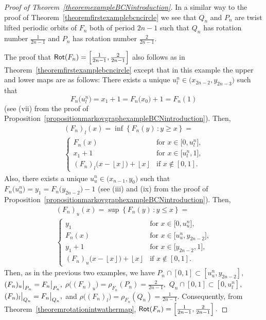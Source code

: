 \documentclass[a4paper, 11pt]{amsart}
\numberwithin{equation}{section}
\theoremstyle{customnumberedtheorem}
\theoremstyle{definitionwithbfnote}
\DeclareMathOperator{\Rot}{\textsf{\upshape Rot}}
\newcommand{\set}[2]{\ensuremath{\left\{#1 \,\colon #2\right\}}}
\newcommand{\floor}[1]{\ensuremath{\left\lfloor #1 \right\rfloor}}
\newcommand{\evalat}[1]{\bigr\rvert\sb{#1}}
\begin{document}
\begin{proof}[Proof of Theorem~\ref{theoremexampleBCNintroduction}]
In a similar way to the proof of Theorem~\ref{theoremfirstexamplebcncircle}
we see that $Q_n$ and $P_n$ are twist lifted periodic orbits of $F_n$
both of period $2n-1$ such that
$Q_n$ has rotation number $\tfrac{1}{2n-1}$ and
$P_n$ has rotation number $\tfrac{2}{2n-1}.$

The proof that $\Rot(F_n) = \left[\tfrac{1}{2n-1}, \tfrac{2}{2n-1}\right]$
also follows as in Theorem~\ref{theoremfirstexamplebcncircle}
except that in this example the upper and lower maps are as follows:
There exists a unique
$u^n_l \in \bigl(x_{2n-2},y_{2n-3}\bigr)$ such that
\[ F_n\bigl(u^n_l\bigr) = x_1 + 1 = F_n\bigl(x_0\bigr) + 1 = F_n(1) \]
(see (vii) from the proof of Proposition~\ref{propositionmarkovgraphexampleBCNintroduction}).
Then,
\begin{multline*}
 (F_n)_l(x) = \inf\set{F_n(y)}{y \ge x} = \\
 \begin{cases}
    F_n(x)& \text{for $x \in \bigl[0, u^n_l\bigr]$,}\\
    x_1+1 & \text{for $x \in \bigl[u^n_l,1\bigr]$,}\\
    (F_n)_l\bigl(x - \floor{x}\bigr) + \floor{x} & \text{if $x \notin [0,1].$}
 \end{cases}
\end{multline*}
Also, there exists a unique $u^n_u \in \bigl(x_{n-1},y_0)$ such that
$F_n\bigl(u^n_u\bigr) = y_{1} = F_n\bigl(y_{2n-2}) - 1$
(see (iii) and (ix) from the proof of Proposition~\ref{propositionmarkovgraphexampleBCNintroduction}).
Then,
\begin{multline*}
 (F_n)_u(x) = \sup\set{F_n(y)}{y \le x} = \\
 \begin{cases}
    y_1   & \text{for $x \in \bigl[0, u^n_u\bigr]$,}\\
    F_n(x)   & \text{for $x \in \bigl[u^n_u,y_{2n-2}\bigr]$,}\\
    y_1+1 & \text{for $x \in \bigl[y_{2n-2}, 1\bigr]$,}\\
    (F_n)_u\bigl(x - \floor{x}\bigr) + \floor{x} & \text{if $x \notin [0,1].$}
 \end{cases}
\end{multline*}
Then, as in the previous two examples, we have
$P_n \cap [0,1] \subset [u^n_u,y_{2n-2}],$
$(F_n)_u\evalat{P_n} = F_n\evalat{P_n},$
$\rho\bigl((F_n)_u\bigr) = \rho_{F_n}(P_n) = \tfrac{2}{2n-1},$
$Q_n \cap [0,1] \subset [0, u^n_l],$
$(F_n)_l\evalat{Q_n} = F_n\evalat{Q_n},$
and
$\rho\bigl((F_n)_l\bigr) = \rho_{F_n}(Q_n) = \tfrac{1}{2n-1}.$
Consequently, from Theorem~\ref{theoremrotationintwathermap},
$\Rot(F_n) = \left[\tfrac{1}{2n-1}, \tfrac{2}{2n-1}\right].$


\end{proof}
\end{document}
